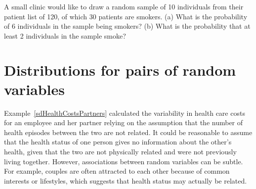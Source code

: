 \begin{exercisewrap}
\begin{nexercise}
A small clinic would like to draw a random sample of 10 individuals from their patient list of 120, of which 30 patients are smokers. (a) What is the probability of 6 individuals in the sample being smokers? (b) What is the probability that at least 2 individuals in the sample smoke?\footnotemark{}
\end{nexercise}
\end{exercisewrap}



\section{Distributions for pairs of random variables}
\label{correlatedRVs}


Example~\ref{sdHealthCostsPartners} calculated the variability in health care costs for an employee and her partner relying on the assumption that the number of health episodes between the two are not related. It could be reasonable to assume that the health status of one person gives no information about the other's health, given that the two are not physically related and were not previously living together. However, associations between random variables can be subtle. For example, couples are often attracted to each other because of common interests or lifestyles, which suggests that health status may actually be related.

